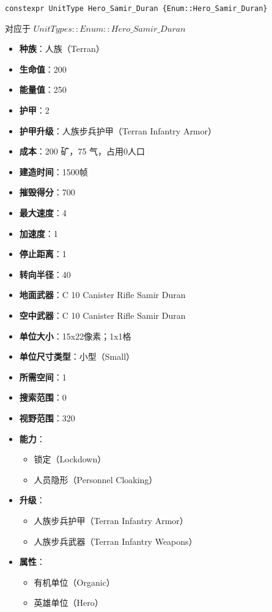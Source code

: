 \begin{tcolorbox}[colback=white, colframe=black!60!white, title=Hero\_Samir\_Duran(), arc=0mm]
    \begin{verbatim}
constexpr UnitType Hero_Samir_Duran {Enum::Hero_Samir_Duran}
    \end{verbatim}
    对应于  $ UnitTypes::Enum::Hero\_Samir\_Duran $ 
    \begin{itemize}
        \item \textbf{种族}：人族（Terran）
        \item \textbf{生命值}：200
        \item \textbf{能量值}：250
        \item \textbf{护甲}：2
        \item \textbf{护甲升级}：人族步兵护甲（Terran Infantry Armor）
        \item \textbf{成本}：200 矿，75 气，占用0人口
        \item \textbf{建造时间}：1500帧
        \item \textbf{摧毁得分}：700
        \item \textbf{最大速度}：4
        \item \textbf{加速度}：1
        \item \textbf{停止距离}：1
        \item \textbf{转向半径}：40
        \item \textbf{地面武器}：C 10 Canister Rifle Samir Duran
        \item \textbf{空中武器}：C 10 Canister Rifle Samir Duran
        \item \textbf{单位大小}：15x22像素；1x1格
        \item \textbf{单位尺寸类型}：小型（Small）
        \item \textbf{所需空间}：1
        \item \textbf{搜索范围}：0
        \item \textbf{视野范围}：320
        \item \textbf{能力}：
            \begin{itemize}
                \item 锁定（Lockdown）
                \item 人员隐形（Personnel Cloaking）
            \end{itemize}
        \item \textbf{升级}：
            \begin{itemize}
                \item 人族步兵护甲（Terran Infantry Armor）
                \item 人族步兵武器（Terran Infantry Weapons）
            \end{itemize}
        \item \textbf{属性}：
            \begin{itemize}
                \item 有机单位（Organic）
                \item 英雄单位（Hero）
            \end{itemize}
    \end{itemize}
\end{tcolorbox}

